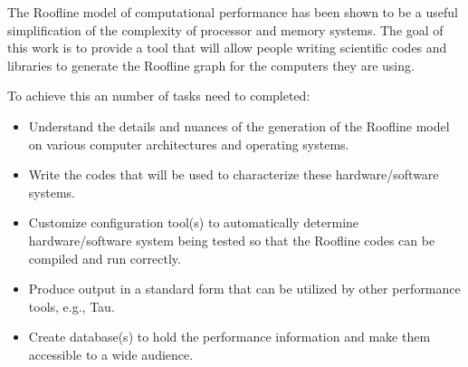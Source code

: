 The Roofline model of computational performance has been shown to be a useful
simplification of the complexity of processor and memory systems. The goal of
this work is to provide a tool that will allow people writing scientific codes
and libraries to generate the Roofline graph for the computers they are using.

To achieve this an number of tasks need to completed:
\begin{itemize}

\vspace{-0.1in}
\item{Understand the details and nuances of the generation of the Roofline
      model on various computer architectures and operating systems.}

\vspace{-0.1in}
\item{Write the codes that will be used to characterize these
      hardware/software systems.} 

\vspace{-0.1in}
\item{Customize configuration tool(s) to automatically determine
      hardware/software system being tested so that the Roofline codes can be
      compiled and run correctly.}

\vspace{-0.1in}
\item{Produce output in a standard form that can be utilized by other
      performance tools, e.g., Tau.}

\vspace{-0.1in}
\item{Create database(s) to hold the performance information and make them
      accessible to a wide audience.}

\end{itemize}

